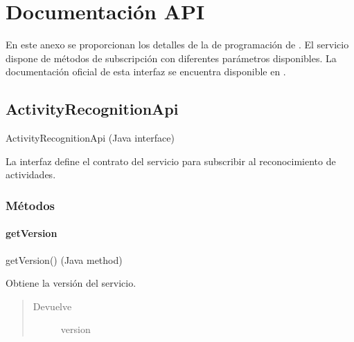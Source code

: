 
\chapter{Documentación API}

\label{chapB:java-api}

En este anexo se proporcionan los detalles de la  de programación de . 
El servicio dispone de métodos de subscripción con diferentes parámetros disponibles. La documentación oficial de esta interfaz se encuentra disponible en \cite{GimenezYegros2016d}.

\section{ActivityRecognitionApi}
\label{org/hardroid/api/ActivityRecognitionApi:activityrecognitionapi}ActivityRecognitionApi (Java interface)

\begin{fulllineitems}
\label{org/hardroid/api/ActivityRecognitionApi:org.hardroid.api.ActivityRecognitionApi} \par
La interfaz define el contrato del servicio para subscribir al reconocimiento de actividades.
\end{fulllineitems}

\subsection{Métodos}
\label{org/hardroid/api/ActivityRecognitionApi:methods}

\subsubsection{getVersion}
\label{org/hardroid/api/ActivityRecognitionApi:getversion}getVersion() (Java method)

\begin{fulllineitems}
\label{org/hardroid/api/ActivityRecognitionApi:org.hardroid.api.ActivityRecognitionApi.getVersion()} \par
Obtiene la versión del servicio.
\begin{quote}\begin{description}
\item[{Devuelve}] \leavevmode
version

\end{description}\end{quote}

\end{fulllineitems}


